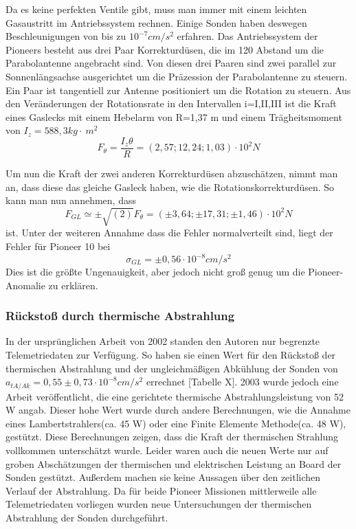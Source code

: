 Da es keine perfekten Ventile gibt, muss man immer mit einem leichten
Gasaustritt im Antriebssystem rechnen. Einige Sonden\cite{Anderson2002} haben
deswegen Beschleunigungen von bis zu $10^{-7}\mathit{cm}/s^{2}$
erfahren. Das Antriebssystem der Pioneers besteht aus drei Paar
Korrekturd\"usen, die im 120{\textdegree} Abstand um die Parabolantenne
angebracht sind. Von diesen drei Paaren sind zwei parallel zur
Sonnenl\"angsachse ausgerichtet um die Pr\"azession der Parabolantenne
zu steuern. Ein Paar ist tangentiell zur Antenne positioniert um die
Rotation zu steuern. Aus den Ver\"anderungen der Rotationsrate in den
Intervallen i=I,II,III ist die Kraft eines Gaslecks mit einem Hebelarm
von R=1,37 m und einem Tr\"agheitsmoment von
$I_{z}=588,3\mathit{kg}\cdot\ m^{2}$
\begin{equation}
F_{\theta }=\frac{I_{z}\theta }{R}=(2,57;12,24;1,03)\cdot
10^{2}N
\end{equation}

Um nun die Kraft der zwei anderen Korrekturd\"usen abzusch\"atzen, nimmt
man an, dass diese das gleiche Gasleck haben, wie die
Rotationskorrekturd\"usen. So kann man nun annehmen\cite{Anderson2002}, dass
\begin{equation}
F_{\mathit{GL}}\simeq \pm \sqrt{(2)}F_{\theta }=(\pm 3,64;\pm
17,31;\pm 1,46)\cdot 10^{2}N
\end{equation}
ist. Unter der weiteren Annahme dass die Fehler normalverteilt sind,
liegt der Fehler f\"ur Pioneer 10 bei
\begin{equation}
\sigma _{\mathit{GL}}=\pm 0,56\cdot 10^{-8}\mathit{cm}/s^{2}
\end{equation}
Dies ist die gr\"o{\ss}te Ungenauigkeit, aber jedoch nicht gro{\ss}
genug um die Pioneer-Anomalie zu erkl\"aren.


\bigskip

\subsubsection{R\"ucksto{\ss} durch thermische Abstrahlung}\label{Hitze}

In der urspr\"unglichen Arbeit von 2002 \cite{Anderson2002} standen den Autoren nur
begrenzte Telemetriedaten zur Verf\"ugung. So haben sie einen Wert
f\"ur den R\"ucksto{\ss} der thermischen Abstrahlung und der
ungleichm\"a{\ss}igen Abk\"uhlung der Sonden von
$a_{\mathit{tA}/\mathit{Ak}}=0,55\pm 0,73\cdot
10^{-8}\mathit{cm}/s^{2}$ errechnet \cite{Anderson2002}[Tabelle X]. 2003 wurde jedoch
eine Arbeit ver\"offentlicht, die eine gerichtete thermische
Abstrahlungsleistung von 52 W angab. Dieser hohe Wert wurde durch
andere Berechnungen, wie die Annahme eines Lambertstrahlers(ca. 45 W)
oder eine Finite Elemente Methode(ca. 48 W), gest\"utzt\cite{Turyshev2010}. Diese Berechnungen zeigen, dass die Kraft der
thermischen Strahlung vollkommen untersch\"atzt wurde. Leider waren
auch die neuen Werte nur auf groben Absch\"atzungen der thermischen und
elektrischen Leistung an Board der Sonden gest\"utzt. Au{\ss}erdem
machen sie keine Aussagen \"uber den zeitlichen Verlauf der
Abstrahlung. Da f\"ur beide Pioneer Missionen mittlerweile alle
Telemetriedaten vorliegen wurden neue Untersuchungen der thermischen
Abstrahlung der Sonden durchgef\"uhrt.

